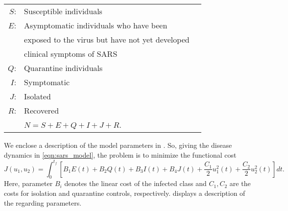 \begin{table}[h!]
	\begin{center}
		\begin{tabular}{@{}rll@{}} 
			$S$: & Susceptible individuals 
			\\
			$E$: & Asymptomatic individuals who have been 
			\\
			   & exposed to the virus but have not yet developed 
			\\
			   & clinical symptoms of SARS 
			\\
			$Q$: & Quarantine individuals
			\\
			$I$: & Symptomatic 
			\\
			$J$: & Isolated
			\\
			$R$: & Recovered
			\\
				& $N = S + E + Q + I + J + R$.
		\end{tabular}
	\end{center}
\end{table}
We enclose a description of the model parameters 
in .
So, giving the disease dynamics in \eqref{eqn:sars_model}, the problem is to 
minimize the functional cost
\begin{equation}\label{eqn:sars_cost}
  J(u_1,u_2)
    = \int_{0}^{t_f}
      \left[
        B_1 E(t)
        + B_2 Q(t)
        + B_3 I(t)
        + B_4 J(t)
        + \frac{C_1}{2} u_1^2 (t)
        + \frac{C_2}{2} u_2^2 (t)
      \right]
      dt.
\end{equation}
Here, parameter $B_i$ denotes the linear cost of the infected 
class and $C_1, C_2$ are the costs for isolation and quarantine controls, respectively.
 displays a description of the regarding parameters.
%
